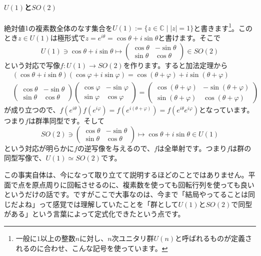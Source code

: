 \paragraph{$U(1)$と$SO(2)$} 絶対値$1$の複素数全体のなす集合を$U(1) := \{ z \in \mathbb{C} \mid |z| = 1 \} $と書きます\footnote{一般に$1$以上の整数$n$に対し、$n$次ユニタリ群$U(n)$と呼ばれるものが定義されるのに合わせ、こんな記号を使っています。}。このとき$z \in U(1)$は極形式で$z = e^{i\theta} = \cos\theta + i \sin\theta$と書けます。そこで
\[
U(1) \ni \cos\theta + i \sin\theta \mapsto
\begin{pmatrix}
\cos\theta & -\sin\theta \\
\sin\theta & \cos\theta
\end{pmatrix}
\in SO(2)
\]
という対応で写像$f \colon U(1) \rightarrow SO(2)$を作ります。すると加法定理から
\begin{align*}
&(\cos\theta + i \sin\theta)(\cos\varphi + i \sin\varphi)
= \cos(\theta + \varphi) + i \sin(\theta + \varphi) \\
&\begin{pmatrix}
\cos\theta & -\sin\theta \\
\sin\theta & \cos\theta
\end{pmatrix}
\begin{pmatrix}
\cos\varphi & -\sin\varphi \\
\sin\varphi & \cos\varphi
\end{pmatrix}
=
\begin{pmatrix}
\cos(\theta + \varphi) & -\sin(\theta + \varphi) \\
\sin(\theta + \varphi) & \cos(\theta + \varphi)
\end{pmatrix}
\end{align*}
が成り立つので、$f(e^{i\theta}) f(e^{i\varphi}) = f(e^{i(\theta + \varphi)}) = f(e^{i\theta} e^{i\varphi})$となっています。つまり$f$は群準同型です。そして
\[
SO(2) \ni
\begin{pmatrix}
\cos\theta & -\sin\theta \\
\sin\theta & \cos\theta
\end{pmatrix}
\mapsto
\cos\theta + i \sin\theta
\in U(1)
\]
という対応が明らかに$f$の逆写像を与えるので、$f$は全単射です。つまり$f$は群の同型写像で、$U(1) \simeq SO(2)$です。

この事実自体は、今になって取り立てて説明するほどのことではありません。平面で点を原点周りに回転させるのに、複素数を使っても回転行列を使っても良いというだけの話です。ですがここで大事なのは、今まで「結局やってることは同じだよね」って感覚では理解していたことを「群として$U(1)$と$SO(2)$で同型がある」という言葉によって定式化できたという点です。

